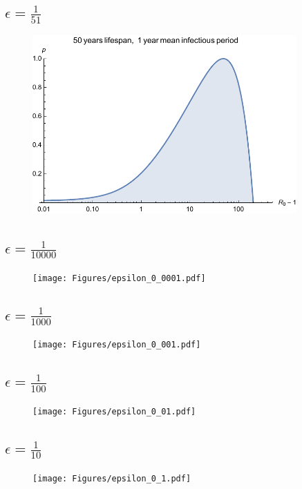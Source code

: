 \documentclass[12pt]{article}
\begin{document}
\subsection{$\epsilon=\frac{1}{51}$}
\begin{figure}[H]
  \caption{}
  \centering
  \includegraphics[width=0.9\textwidth]{Figures/50_365.pdf}
\end{figure}

\subsection{$\epsilon=\frac{1}{10000}$}
\begin{figure}[H]
  \caption{}
  \centering
  \texttt{[image: Figures/epsilon\_0\_0001.pdf]}
\end{figure}

\subsection{$\epsilon=\frac{1}{1000}$}
\begin{figure}[H]
  \caption{}
  \centering
  \texttt{[image: Figures/epsilon\_0\_001.pdf]}
\end{figure}

\subsection{$\epsilon=\frac{1}{100}$}
\begin{figure}[H]
  \caption{}
  \centering
  \texttt{[image: Figures/epsilon\_0\_01.pdf]}
\end{figure}

\subsection{$\epsilon=\frac{1}{10}$}
\begin{figure}[H]
  \caption{}
  \centering
  \texttt{[image: Figures/epsilon\_0\_1.pdf]}
\end{figure}
\end{document}
